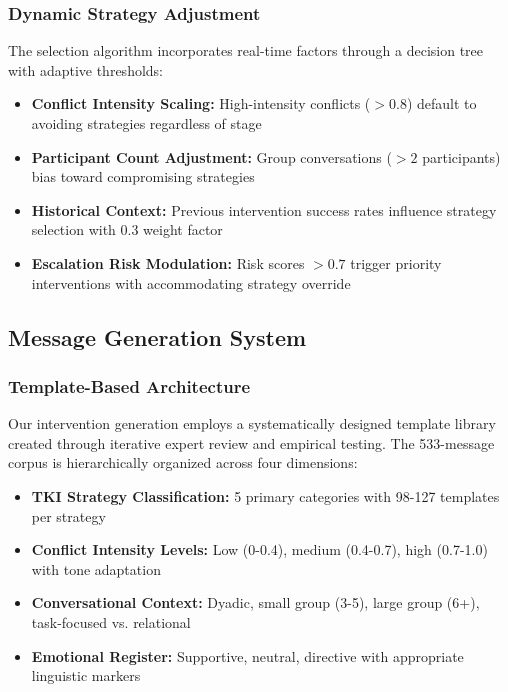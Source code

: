 \documentclass[12pt,a4paper]{article}
\begin{document}
\subsubsection{Dynamic Strategy Adjustment}
The selection algorithm incorporates real-time factors through a decision tree with adaptive thresholds:
\begin{itemize}
\item \textbf{Conflict Intensity Scaling:} High-intensity conflicts ($>0.8$) default to avoiding strategies regardless of stage
\item \textbf{Participant Count Adjustment:} Group conversations ($>2$ participants) bias toward compromising strategies
\item \textbf{Historical Context:} Previous intervention success rates influence strategy selection with 0.3 weight factor
\item \textbf{Escalation Risk Modulation:} Risk scores $>0.7$ trigger priority interventions with accommodating strategy override
\end{itemize}

\subsection{Message Generation System}

\subsubsection{Template-Based Architecture}
Our intervention generation employs a systematically designed template library created through iterative expert review and empirical testing. The 533-message corpus is hierarchically organized across four dimensions:

\begin{itemize}
\item \textbf{TKI Strategy Classification:} 5 primary categories with 98-127 templates per strategy
\item \textbf{Conflict Intensity Levels:} Low (0-0.4), medium (0.4-0.7), high (0.7-1.0) with tone adaptation
\item \textbf{Conversational Context:} Dyadic, small group (3-5), large group (6+), task-focused vs. relational
\item \textbf{Emotional Register:} Supportive, neutral, directive with appropriate linguistic markers
\end{itemize}
\end{document}
